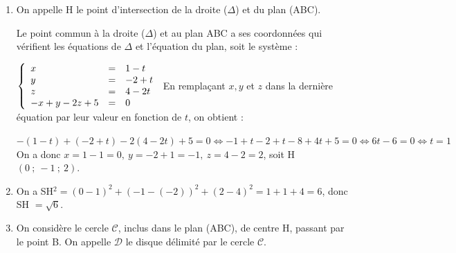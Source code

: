 \begin{enumerate}
On sait qu'un vecteur normal au plan ABC a pour coordonnées les coefficients de $x, y$ et $z$ dans l'équation de ce plan. Donc on a $\vect{n}\begin{pmatrix}-1\\1\\-2\end{pmatrix}$.

La droite ($\Delta$) orthogonale au plan ABC a un vecteur directeur colinéaire au vecteur $\vect{n}$.

Donc $M(x~;~y~;~z) \in (\Delta) \iff \vect{\text{S}M} = t\vect{n}$, avec $t \in \R$, ce qui se traduit par les équations paramétriques:

$\left\{\begin{array}{l c l}
x - 1&=&- t\\
y - (- 2)&=&1t\\
z -4&=&-2t
\end{array}\right.\iff \left\{\begin{array}{l c l}
x &=&1 - t\\
y &=& -2 + t\\
z &=&4 -2t
\end{array}\right.$\quad $t \in \R \iff M(x~;~y~;~z) \in (\Delta) $.
\item On appelle H le point d'intersection de la droite ($\Delta$) et du plan (ABC).

Le point commun à la droite ($\Delta$) et au plan ABC a ses coordonnées qui vérifient les équations de $\Delta$ et l'équation du plan, soit le système :

$\left\{\begin{array}{l c l} 
x &=&1 - t\\
y &=& -2 + t\\
z &=&4 -2t\\
-x + y - 2z + 5 &=& 0
\end{array}\right.$ En remplaçant $x, y$ et $z$ dans la dernière équation par leur valeur en fonction de $t$, on obtient :

$- (1 - t) + (-2 + t) - 2(4 - 2t) + 5 = 0 \iff - 1 + t - 2 + t - 8 + 4t + 5 = 0 \iff 6t - 6 = 0 
\iff t = 1$
On a donc $x = 1 - 1 = 0, \: y = - 2 + 1 = - 1, \: z = 4 - 2 = 2$, soit H$(0~;~- 1~;~2)$.

\item %
On a SH$^2 = (0 - 1)^2 + (- 1 - (-2))^2 + (2 - 4)^2 = 1 + 1 + 4 = 6$, donc SH $= \sqrt{6}$.
\item On considère le cercle $\mathcal{C}$, inclus dans le plan (ABC), de centre H, passant par le
point B. On appelle $\mathcal{D}$ le disque délimité par le cercle $\mathcal{C}$.


\end{enumerate}
